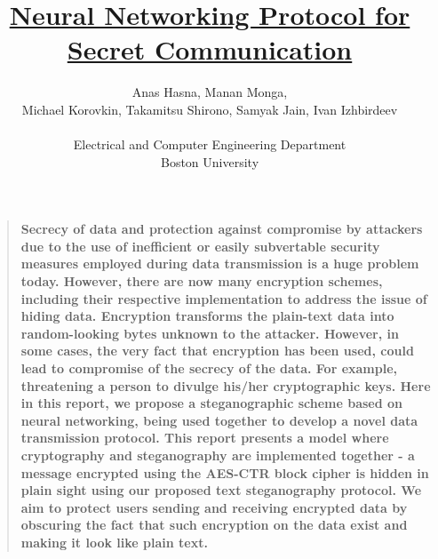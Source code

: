 \documentclass[12pt]{article}
\title{\LARGE \underline{Neural Networking Protocol for Secret Communication}}
\author
{Anas Hasna, Manan Monga,\\ Michael Korovkin, Takamitsu Shirono, Samyak Jain, Ivan Izhbirdeev\\
\\
\normalsize{\large Electrical and Computer Engineering Department}\\
\normalsize{\large Boston University}
}
\date{}
\newenvironment{sciabstract}{%
\begin{quote} \bf}
{\end{quote}}
\begin{document}
 


\baselineskip18pt

\begin{center}




\begin{sciabstract}
  Secrecy of data and protection against compromise by attackers due to the use of inefficient or easily subvertable security measures employed during data transmission is a huge problem today. However, there are now many encryption schemes, including their respective implementation to address the issue of hiding data. Encryption transforms the plain-text data into random-looking bytes unknown to the attacker. However, in some cases, the very fact that encryption has been used, could lead to compromise of the secrecy of the data. For example, threatening a person to divulge his/her cryptographic keys. Here in this report, we propose a steganographic scheme based on neural networking, being used together to develop a novel data transmission protocol. This report presents a model where cryptography and steganography are implemented together - a message encrypted using the AES-CTR block cipher is hidden in plain sight using our proposed text steganography protocol. We aim to protect users sending and receiving encrypted data by obscuring the fact that such encryption on the data exist and making it look like plain text.
\end{sciabstract}
\end{center}



\end{document}

